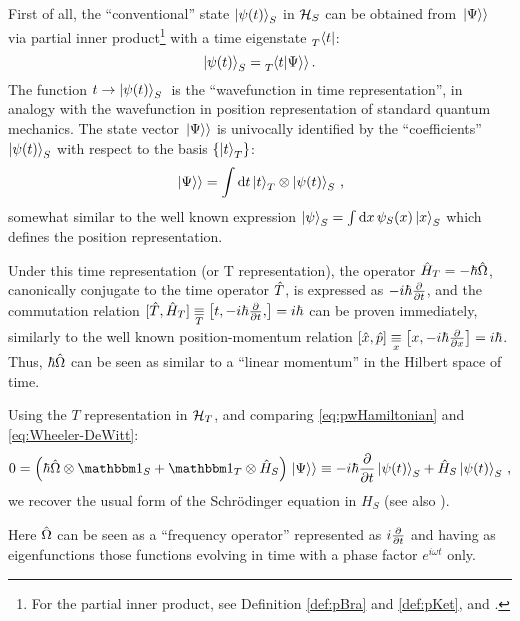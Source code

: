 First of all, the ``conventional'' state $\ket{\psi(t)}_S$ in $\mathcal{H}_S$
can be obtained from $\left.\left| \Psi \right\rangle\right\rangle$ via partial inner product\footnote{
  For the partial inner product,
  see Definition \ref{def:pBra} and \ref{def:pKet},
  and \cite[.3]{QMT_Jacobs}.
}
with a time eigenstate $\prescript{}{T}{\bra{t}}$:
\begin{equation*}
  \ket{\psi(t)}_S = \prescript{}{T}{\!\left.\left\langle t \middle| \Psi \right\rangle\right\rangle} \, \text{.}
\end{equation*}
The function $ t \rightarrow \ket{\psi(t)}_S \; $ is the
``wavefunction in time representation'', in analogy
with the wavefunction in position representation of standard quantum mechanics.
The state vector $\left.\left| \Psi \right\rangle\right\rangle$ is univocally identified by the ``coefficients'' $\ket{\psi(t)}_S$
with respect to the basis $\left\{\ket{t}_T\right\}$:
\begin{equation}\label{eq:pw:}
  \left.\left| \Psi \right\rangle\right\rangle = \int \dd{t} \ket{t}_T \otimes \ket{\psi(t)}_S \, \text{,}
\end{equation}
somewhat similar to the well known expression $\ket{\psi}_S = \int \dd{x} \psi_{S}(x) \ket{x}_S$
which defines the position representation.

Under this time representation (or T representation), the operator $\hat{H}_T = -\hbar\hat{\Omega}$,
canonically conjugate to the time operator $\hat{T}$, is expressed as $-i\hbar\pdv{t}$,
and the commutation relation
$[\op{T}, \op{H}_T] \repr[T] \comm{t, -i\hbar\pdv{t}}{} = i\hbar$
can be proven
immediately, similarly to the well known position-momentum relation
$\comm{\op{x}}{\op{p}} \repr[x] \comm{x}{-i\hbar\pdv{x}} = i\hbar$.
Thus, $\hbar\hat{\Omega}$ can be seen as similar to a ``linear momentum''
in the Hilbert space of time.


Using the $T$ representation in $\mathcal{H}_T$,
and comparing \eqref{eq:pwHamiltonian} and \eqref{eq:Wheeler-DeWitt}:
\begin{equation}\label{eq:schrod_from_pw}
  0 = \qty(\hbar\op{\Omega}\ox\idop_S + \idop_{T}\ox\op{H}_S)\dket{\Psi}
    \repr -i\hbar\pdv{t}\ket{\psi(t)}_{S} + \op{H}_S\ket{\psi(t)}_{S}
    \,\text{,}
\end{equation}
we recover the usual form of the Schr\"{o}dinger equation in $H_S$
(see also \cite[709--710]{Wootters:Loyola}).

Here $\hat{\Omega}$ can be seen as a ``frequency operator''
represented as $i\pdv{t}$ and having as eigenfunctions
those functions evolving in time with a phase factor $e^{i \omega t}$ only.

